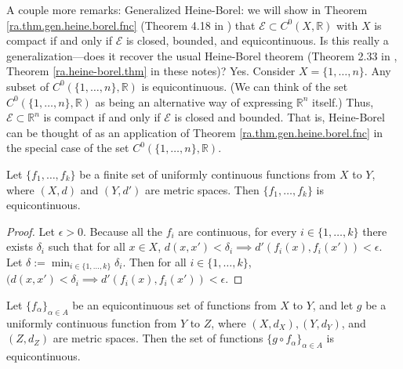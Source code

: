 A couple more remarks: Generalized Heine-Borel: we will show in Theorem \ref{ra.thm.gen.heine.borel.fnc} (Theorem 4.18 in \citet{pugh2015real}) that \(\mathcal{E} \subset C^0(X, \mathbb{R})\) with \(X\) is compact if and only if \(\mathcal{E}\) is closed, bounded, and equicontinuous. Is this really a generalization---does it recover the usual Heine-Borel theorem (Theorem 2.33 in \citet{pugh2015real}, Theorem \ref{ra.heine-borel.thm} in these notes)? Yes. Consider \(X = \{1, \ldots,n \}\). Any subset of \(C^0(\{1, \ldots, n\}, \mathbb{R})\) is equicontinuous. (We can think of the set \(C^0(\{1, \ldots, n\}, \mathbb{R})\) as being an alternative way of expressing \(\mathbb{R}^n\) itself.) Thus, \(\mathcal{E} \subset \mathbb{R}^n\) is compact if and only if \(\mathcal{E}\) is closed and bounded. That is, Heine-Borel can be thought of as an application of Theorem \ref{ra.thm.gen.heine.borel.fnc} in the special case of the set \(C^0(\{1, \ldots, n\}, \mathbb{R})\).


%
%
%
%
%
%
%

\begin{proposition}\label{ra.425b.hw5.finite.set}

Let \(\{f_1, \ldots, f_k\}\) be a finite set of uniformly continuous functions from \(X\) to \(Y\), where \((X,d)\) and \((Y,d')\) are metric spaces. Then \(\{f_1, \ldots, f_k\}\) is equicontinuous.

\end{proposition}


\begin{proof}

Let \(\epsilon > 0\). Because all the \(f_i\) are continuous, for every \(i \in \{1, \ldots, k\}\) there exists \(\delta_i\) such that for all \(x \in X\), \(d(x, x') < \delta_i \implies d'(f_i(x), f_i(x')) < \epsilon\). Let \(\delta := \min_{i \in \{1, \ldots, k\}} \delta_i\). Then for all \(i \in \{1, \ldots, k\}\), \((d(x, x') < \delta_i \implies d'(f_i(x), f_i(x')) < \epsilon\). 

\end{proof}


\begin{proposition}\label{ra.425b.hw5.3}

Let \(\{f_\alpha\}_{\alpha \in A}\) be an equicontinuous set of functions from \(X\) to \(Y\), and let \(g\) be a uniformly continuous function from \(Y\) to \(Z\), where \((X, d_X), (Y, d_Y)\), and \((Z, d_Z)\) are metric spaces. Then the set of functions \(\{g \circ f_\alpha\}_{\alpha \in A}\) is equicontinuous.

\end{proposition}


